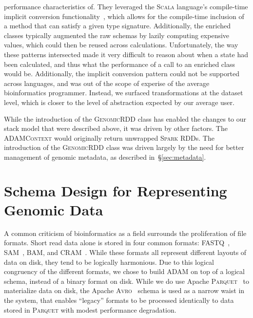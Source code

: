 \documentclass[phd]{ucbthesis}
\begin{document}
\begin{itemize}
  performance characteristics of. They leveraged the \textsc{Scala} language's
  compile-time implicit conversion functionality~\cite{odersky04}, which allows for
  the compile-time inclusion of a method that can satisfy a given type
  signature. Additionally, the enriched classes typically augmented the raw
  schemas by lazily computing expensive values, which could then be reused
  across calculations. Unfortunately, the way these patterns intersected made it
  very difficult to reason about when a state had been calculated, and thus what
  the performance of a call to an enriched class would be. Additionally, the
  implicit conversion pattern could not be supported across languages, and was
  out of the scope of experise of the average bioinformatics programmer.
  Instead, we surfaced transformations at the dataset level, which is closer to
  the level of abstraction expected by our average user.
\end{itemize}

While the introduction of the \textsc{GenomicRDD} class has enabled the changes
to our stack model that were described above, it was driven by other factors.
The \textsc{ADAMContext} would originally return unwrapped \textsc{Spark} RDDs.
The introduction of the \textsc{GenomicRDD} class was driven largely by the need
for better management of genomic metadata, as described in~\S\ref{sec:metadata}.

\section{Schema Design for Representing Genomic Data}
\label{sec:schema-design}

A common criticism of bioinformatics as a field surrounds the proliferation of file formats. Short read data alone is
stored in four common formats: \textsc{FASTQ}~\cite{cock10}, \textsc{SAM}~\cite{li09}, \textsc{BAM}, and
\textsc{CRAM}~\cite{fritz11}. While these formats all represent different layouts of data on disk, they tend to be
logically harmonious. Due to this logical congruency of the different formats, we chose to build \textsc{ADAM}
on top of a logical schema, instead of a binary format on disk. While we do use Apache \textsc{Parquet}~\cite{parquet} to
materialize data on disk, the Apache \textsc{Avro}~\cite{avro} schema is used as a narrow waist in the system,
that enables ``legacy'' formats to be processed identically to data stored in \textsc{Parquet} with modest performance
degradation.
\end{document}
